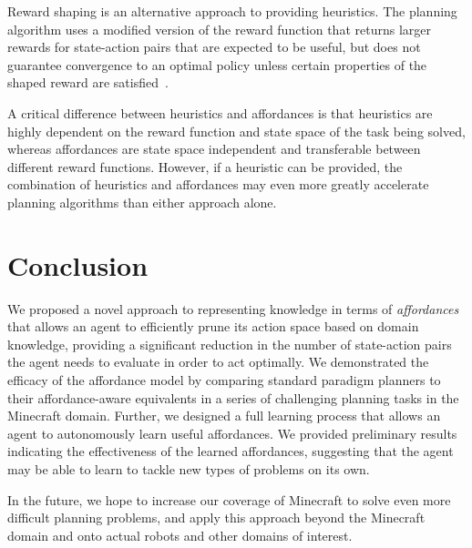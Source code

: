\documentclass[conference]{IEEEtran}
\begin{document}
Reward shaping is an alternative approach to providing heuristics. The planning algorithm uses a modified version of the reward function that returns larger rewards for state-action pairs that are expected to be useful, but does not guarantee convergence to an optimal policy unless certain properties of the shaped reward are satisfied~\citep{potshap}.

A critical difference between heuristics and affordances is that heuristics are highly dependent on the reward function and state space of the task being solved, whereas affordances are state space independent and transferable between different reward functions. However, if a heuristic can be provided, the combination of heuristics and affordances may even more greatly accelerate planning algorithms than either approach alone.

\section{Conclusion}
\label{sec:conclusion}

We proposed a novel approach to representing knowledge in terms of
{\em affordances}~\citep{gibson77} that allows an agent to efficiently
prune its action space based on domain knowledge,
providing a significant reduction in the number of state-action pairs the
agent needs to evaluate in order to act optimally. We demonstrated the efficacy of the affordance model by comparing standard paradigm
planners to their affordance-aware equivalents in a series of challenging planning tasks in the Minecraft
domain. Further, we designed a full learning process that allows an agent to autonomously learn useful affordances.
We provided preliminary results indicating the effectiveness of the learned affordances, suggesting that
the agent may be able to learn to tackle new types of problems on its own.

In the future, we hope to increase our coverage of Minecraft to solve even more difficult planning problems, and apply this
approach beyond the Minecraft domain and onto actual robots and other domains of interest.


{\small


}
\end{document}
